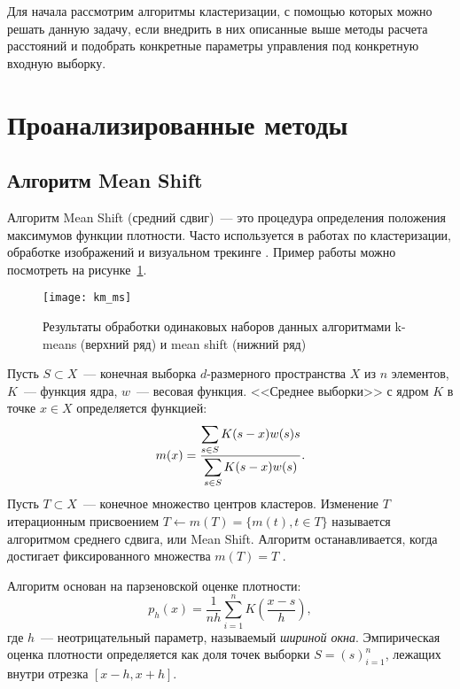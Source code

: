 Для начала рассмотрим алгоритмы кластеризации, с помощью которых можно решать данную задачу, если внедрить в них описанные выше методы расчета расстояний и подобрать конкретные параметры управления под конкретную входную выборку.

\section{Проанализированные методы}
\subsection{Алгоритм Mean Shift}
Алгоритм Mean Shift (средний сдвиг)~--- это процедура определения положения максимумов функции плотности. Часто используется в работах по кластеризации, обработке изображений и визуальном трекинге \cite{ms, meanshift}. Пример работы можно посмотреть на рисунке~\ref{pic:km-ms}.

\begin{figure}[h!]
    \centering
    \texttt{[image: km\_ms]}\\[1ex]
    \parbox{.9\textwidth}{\caption{Результаты обработки одинаковых наборов данных алгоритмами k-means (верхний ряд) и mean shift (нижний ряд)} \label{pic:km-ms}}
\end{figure}

Пусть \( S\subset X \)~--- конечная выборка \( d \)-размерного пространства \( X \) из \( n \) элементов, \( K \)~--- функция ядра, \( w \)~--- весовая функция. <<Среднее выборки>> с ядром \( K \) в точке \( x\in X \) определяется функцией:
\begin{equation}
    m(x) = \frac{\displaystyle\sum_{s\in S} K(s - x)w(s)s}{\displaystyle\sum_{s\in S} K(s - x)w(s)}.
    \label{eq:wiki-shift}
\end{equation}
Пусть \( T\subset X \)~--- конечное множество центров кластеров. Изменение \( T \) итерационным присвоением \( T\gets m(T) = \Big\{ m(t), t\in T\Big\} \) называется алгоритмом среднего сдвига, или Mean Shift. Алгоритм останавливается, когда достигает фиксированного множества \( m(T) = T \) \cite{meanshift}.

Алгоритм основан на парзеновской оценке плотности:
\begin{equation}
    p_h(x) = \frac{1}{nh}\sum_{i=1}^n K\left(\frac{x - s}{h}\right),
    \label{eq:voron2.10}
\end{equation}
где \( h \)~--- неотрицательный параметр, называемый \emph{шириной окна}. Эмпирическая оценка плотности определяется как доля точек выборки \( S = (s)_{i=1}^n \), лежащих внутри отрезка \( [x - h, x + h] \).

